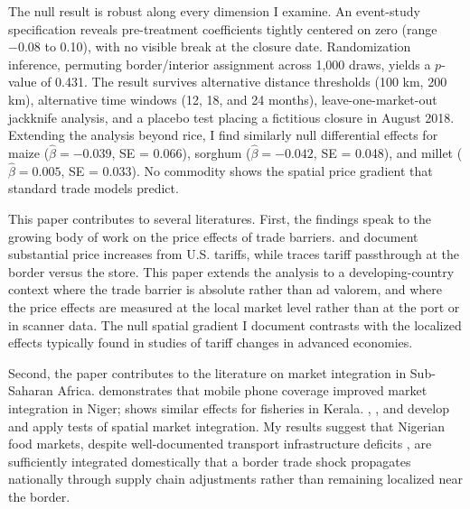 \documentclass[12pt]{article}
\begin{document}
The null result is robust along every dimension I examine. An event-study specification reveals pre-treatment coefficients tightly centered on zero (range $-0.08$ to 0.10), with no visible break at the closure date. Randomization inference, permuting border/interior assignment across 1,000 draws, yields a $p$-value of 0.431. The result survives alternative distance thresholds (100 km, 200 km), alternative time windows (12, 18, and 24 months), leave-one-market-out jackknife analysis, and a placebo test placing a fictitious closure in August 2018. Extending the analysis beyond rice, I find similarly null differential effects for maize ($\hat{\beta} = -0.039$, SE = 0.066), sorghum ($\hat{\beta} = -0.042$, SE = 0.048), and millet ($\hat{\beta} = 0.005$, SE = 0.033). No commodity shows the spatial price gradient that standard trade models predict.

This paper contributes to several literatures. First, the findings speak to the growing body of work on the price effects of trade barriers. \citet{fajgelbaum2020return} and \citet{amiti2019impact} document substantial price increases from U.S. tariffs, while \citet{cavallo2021tariff} traces tariff passthrough at the border versus the store. This paper extends the analysis to a developing-country context where the trade barrier is absolute rather than ad valorem, and where the price effects are measured at the local market level rather than at the port or in scanner data. The null spatial gradient I document contrasts with the localized effects typically found in studies of tariff changes in advanced economies.

Second, the paper contributes to the literature on market integration in Sub-Saharan Africa. \citet{aker2010information} demonstrates that mobile phone coverage improved market integration in Niger; \citet{jensen2007digital} shows similar effects for fisheries in Kerala. \citet{ravallion1986testing}, \citet{baulch1997transfer}, and \citet{getnet2005spatial} develop and apply tests of spatial market integration. My results suggest that Nigerian food markets, despite well-documented transport infrastructure deficits \citep{storeygard2016farther, egger2021trade}, are sufficiently integrated domestically that a border trade shock propagates nationally through supply chain adjustments rather than remaining localized near the border.
\end{document}
